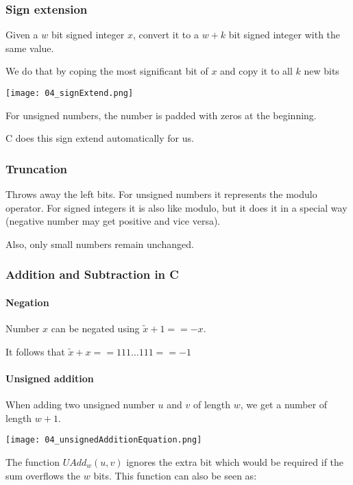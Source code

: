 

\subsubsection{Sign extension}
Given a $w$ bit signed integer $x$, convert it to a $w + k$ bit signed integer with the same value.

We do that by coping the most significant bit of $x$ and copy it to all $k$ new bits

\texttt{[image: 04\_signExtend.png]}

For unsigned numbers, the number is padded with zeros at the beginning.

C does this sign extend automatically for us.

\subsubsection{Truncation}
Throws away the left bits. For unsigned numbers it represents the modulo operator. For signed integers it is also like modulo, but it does it in a special way (negative number may get positive and vice versa).

Also, only small numbers remain unchanged.

\subsubsection{Addition and Subtraction in C}
\paragraph{Negation}
Number $x$ can be negated using $\tilde x + 1 == -x$.

It follows that $\tilde x + x == 111 \dots 111 == -1$

\paragraph{Unsigned addition}
When adding two unsigned number $u$ and $v$ of length $w$, we get a number of length $w + 1$.

\texttt{[image: 04\_unsignedAdditionEquation.png]}

The function $UAdd_w(u,v)$ ignores the extra bit which would be required if the sum overflows the $w$ bits. This function can also be seen as:

